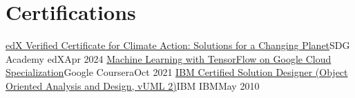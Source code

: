 

\section{Certifications}\label{sec:certifications}
\resumeSubHeadingListStart

\resumeSubheading
{\href{https://courses.edx.org/certificates/efe2a55656d948db9692c246c33df5e7}{edX Verified Certificate for Climate Action: Solutions for a Changing Planet}}{SDG Academy}
{edX}{Apr 2024}
\resumeSubheading
{\href{https://www.coursera.org/account/accomplishments/specialization/certificate/JJTMLY8U43XB}{Machine Learning with TensorFlow on Google Cloud Specialization}}{Google}
{Coursera}{Oct 2021}
\resumeSubheading
{\href{https://drive.google.com/file/d/1xZD_WC_LG5fD0N0FLdJ-ipE5J9z_ZXgH/view?usp=sharing}{IBM Certified Solution Designer (Object Oriented Analysis and Design, vUML 2)}}{IBM}
{IBM}{May 2010}

\resumeSubHeadingListEnd